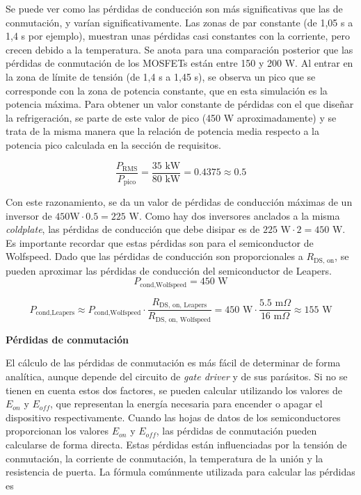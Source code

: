 Se puede ver como las pérdidas de conducción son más significativas que las de conmutación, y varían significativamente. Las zonas de par constante (de 1,05 s a 1,4 s por ejemplo), muestran unas pérdidas casi constantes con la corriente, pero crecen debido a la temperatura. Se anota para una comparación posterior que las pérdidas de conmutación de los MOSFETs están entre 150 y 200 W. Al entrar en la zona de límite de tensión (de 1,4 s a 1,45 s), se observa un pico que se corresponde con la zona de potencia constante, que en esta simulación es la potencia máxima. Para obtener un valor constante de pérdidas con el que diseñar la refrigeración, se parte de este valor de pico (450 W aproximadamente) y se trata de la misma manera que la relación de potencia media respecto a la potencia pico calculada en la sección de requisitos.

\[
\frac{P_{\text{RMS}}}{P_{\text{pico}}} = \frac{35\text{ kW}}{80\text{ kW}} = 0.4375 \approx 0.5
\]

Con este razonamiento, se da un valor de pérdidas de conducción máximas de un inversor de $450 \text{W} \cdot 0.5 = 225 \text{ W}$. Como hay dos inversores anclados a la misma \textit{coldplate}, las pérdidas de conducción que debe disipar es de $225 \text{ W} \cdot 2 = 450 \text{ W}$. Es importante recordar que estas pérdidas son para el semiconductor de Wolfspeed. Dado que las pérdidas de conducción son proporcionales a $R_{\text{DS, on}}$, se pueden aproximar las pérdidas de conducción del semiconductor de Leapers.
\[
P_{\text{cond,Wolfspeed}} = 450 \text{ W}
\]

\[
P_{\text{cond,Leapers}} \approx P_{\text{cond,Wolfspeed}} \cdot \frac{R_{\text{DS, on, Leapers}}}{R_{\text{DS, on, Wolfspeed}}} = 450 \text{ W} \cdot \frac{5.5 \text{ m}\Omega}{16 \text{ m}\Omega} \approx 155 \text{ W}
\]


\textbf{Pérdidas de conmutación}

El cálculo de las pérdidas de conmutación es más fácil de determinar de forma analítica, aunque depende del circuito de \textit{gate driver} y de sus parásitos. Si no se tienen en cuenta estos dos factores, se pueden calcular utilizando los valores de \(E_{on}\) y \(E_{off}\), que representan la energía necesaria para encender o apagar el dispositivo respectivamente. Cuando las hojas de datos de los semiconductores proporcionan los valores \(E_{on}\) y \(E_{off}\), las pérdidas de conmutación pueden calcularse de forma directa. Estas pérdidas están influenciadas por la tensión de conmutación, la corriente de conmutación, la temperatura de la unión y la resistencia de puerta. La fórmula comúnmente utilizada para calcular las pérdidas es

